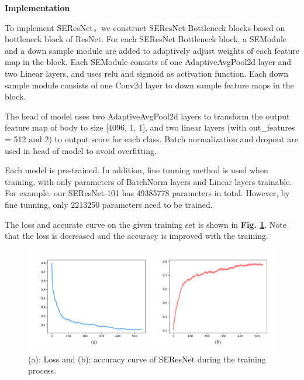 \documentclass[a4paper]{article}
\begin{document}
\vspace{2mm}
\begin{center}
\large\textbf{Implementation} \\
\end{center}

\large{

To implement \textsf{SEResNet}，we construct  \textsf{SEResNet}-Bottleneck blocks based on bottleneck block of \textsf{ResNet}. For each \textsf{SEResNet} Bottleneck block, a SEModule and a down sample module are added to adaptively adjust weights of each feature map in the block. Each SEModule consists of one AdaptiveAvgPool2d layer and two Linear layers, and uses relu and sigmoid as activation function. Each down sample module consists of one Conv2d layer to down sample feature maps in the block.

The head of model uses two AdaptiveAvgPool2d layers to transform the output feature map of body to size [4096, 1, 1], and two linear layers (with out\_features = 512 and 2) to output score for each class. Batch normalization and dropout are used in head of model to avoid overfitting.

Each model is pre-trained. In addition, fine tunning method is used when training, with only parameters of BatchNorm layers and Linear layers trainable. For example, our \textsf{SEResNet-101} has 49385778 parameters in total. However, by fine tunning, only 2213250 parameters need to be trained.

The loss and accurate curve on the given training set is shown in \textbf{Fig. \ref{seres_acc}}. Note that the loss is decreased and the accuracy is improved with the training.

\begin{figure}[h]
\centering
\includegraphics[width=15cm]{seres_acc.pdf}
\caption{(a): Loss and (b): accuracy curve of \textsf{SEResNet} during the training process.}
\label{seres_acc}
\end{figure}

}
\end{document}
